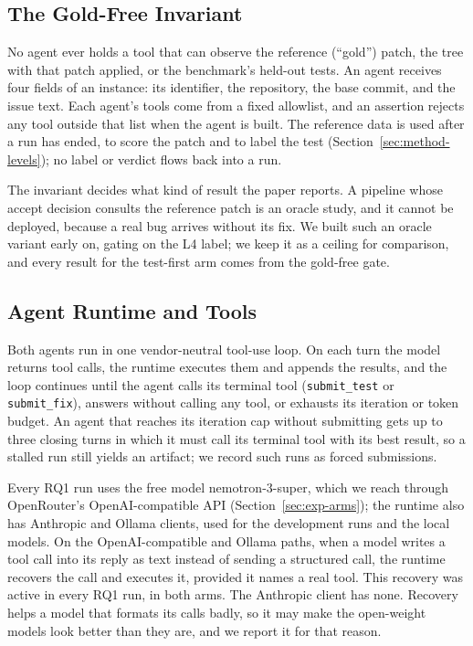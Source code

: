 \subsection{The Gold-Free Invariant}
\label{sec:method-goldfree}

No agent ever holds a tool that can observe the reference (``gold'') patch,
the tree with that patch applied, or the benchmark's held-out tests. An agent
receives four fields of an instance: its identifier, the repository, the base
commit, and the issue text. Each agent's tools come from a fixed allowlist, and
an assertion rejects any tool outside that list when the agent is built. The
reference data is used after a run has ended, to score the
patch and to label the test (Section~\ref{sec:method-levels}); no label or
verdict flows back into a run.

The invariant decides what kind of result the paper reports. A pipeline whose
accept decision consults the reference patch is an oracle study, and it cannot
be deployed, because a real bug arrives without its fix. We built such an
oracle variant early on, gating on the L4 label; we keep it as a ceiling
for comparison, and every result for the test-first arm comes from the
gold-free gate.

\subsection{Agent Runtime and Tools}
\label{sec:method-runtime}

Both agents run in one vendor-neutral tool-use loop. On each turn the model
returns tool calls, the runtime executes them and appends the results, and the
loop continues until the agent calls its terminal tool (\texttt{submit\_test}
or \texttt{submit\_fix}), answers without calling any tool, or exhausts its
iteration or token budget. An agent that reaches its iteration cap without
submitting gets up to three closing turns in which it must call its terminal
tool with its best result, so a stalled run still yields an artifact; we
record such runs as forced submissions.

Every RQ1 run uses the free model nemotron-3-super, which we reach through
OpenRouter's OpenAI-compatible API (Section~\ref{sec:exp-arms}); the runtime
also has Anthropic and Ollama clients, used for the development runs and the
local models. On the OpenAI-compatible and Ollama paths, when a model writes a
tool call into its reply as text instead of sending a structured call, the
runtime recovers the call and executes it, provided it names a real tool. This
recovery was active in every RQ1 run, in both arms. The Anthropic client has
none. Recovery helps a model that formats its calls badly, so it may
make the open-weight models look better than they are, and we report it for
that reason.

